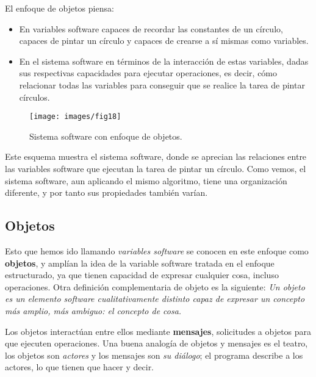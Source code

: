 El enfoque de objetos piensa:
\begin{itemize}
\item En variables software capaces de recordar las constantes de un
  círculo, capaces de pintar un círculo y capaces de crearse a sí mismas
  como variables.
\item En el sistema software en términos de la interacción de estas
  variables, dadas sus respectivas capacidades para ejecutar
  operaciones, es decir, cómo relacionar todas las variables para
  conseguir que se realice la tarea de pintar círculos.
\end{itemize}

\begin{figure}[ht!]  \centering
  \texttt{[image: images/fig18]}
  \caption{Sistema software con enfoque de objetos.}
  \label{fig:18}
\end{figure}

Este esquema muestra el sistema software, donde se aprecian las
relaciones entre las variables software que ejecutan la tarea de
pintar un círculo.  Como vemos, el sistema software, aun aplicando el
mismo algoritmo, tiene una organización diferente, y por tanto sus
propiedades también varían.
\subsection{Objetos}
\label{sec:org2b984f4} Esto que hemos ido llamando \emph{variables
  software} se conocen en este enfoque como \textbf{objetos}, y amplían
la idea de la variable software tratada en el enfoque estructurado, ya
que tienen capacidad de expresar cualquier cosa, incluso operaciones.
Otra definición complementaria de objeto es la siguiente: \emph{Un
  objeto es un elemento software cualitativamente distinto capaz de
  expresar un concepto más amplio, más ambiguo: el concepto de \textit{cosa}.}

\vspace{5mm}

Los objetos interactúan entre ellos mediante \textbf{mensajes},
solicitudes a objetos para que ejecuten operaciones.  Una buena
analogía de objetos y mensajes es el teatro, los objetos son
\emph{actores} y los mensajes son \emph{su diálogo}; el programa
describe a los actores, lo que tienen que hacer y decir.

